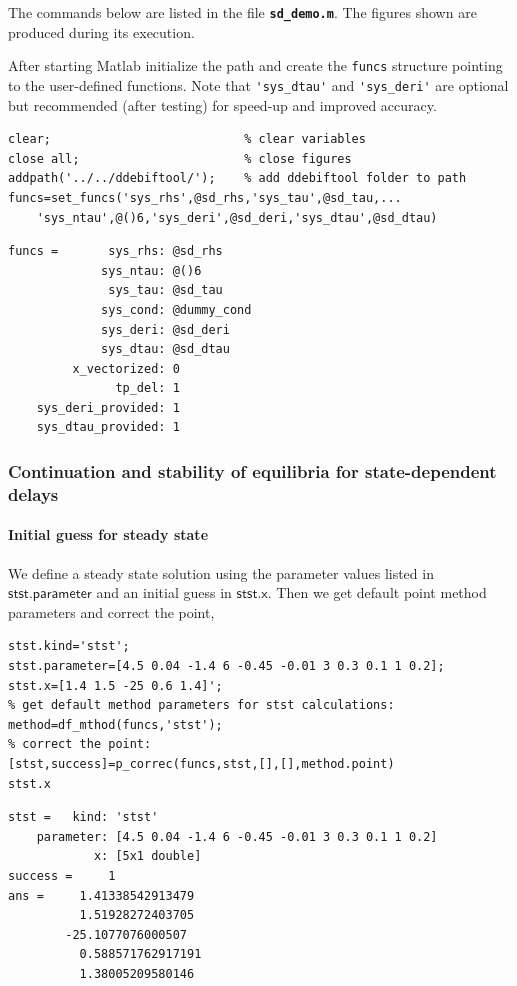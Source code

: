 \documentclass[10pt]{scrartcl}
\newcommand{\file}[1]{\textbf{\texttt{#1}}}
\newcommand{\parm}[1]{\mathsf{#1}}
\newcommand{\blist}[1]{\mbox{\lstinline!#1!}}
\begin{document}
The commands below are listed in the file \file{sd\_demo.m}.
The figures shown are produced during its execution. 

After starting Matlab initialize the path and create the \blist{funcs}
structure pointing to the user-defined functions. Note that
\blist{'sys_dtau'} and \blist{'sys_deri'} are optional but recommended
(after testing) for speed-up and improved accuracy.
\begin{lstlisting}
clear;                           % clear variables
close all;                       % close figures
addpath('../../ddebiftool/');    % add ddebiftool folder to path
funcs=set_funcs('sys_rhs',@sd_rhs,'sys_tau',@sd_tau,...
    'sys_ntau',@()6,'sys_deri',@sd_deri,'sys_dtau',@sd_dtau)
\end{lstlisting}
{\small
\begin{verbatim}
funcs =       sys_rhs: @sd_rhs
             sys_ntau: @()6
              sys_tau: @sd_tau
             sys_cond: @dummy_cond
             sys_deri: @sd_deri
             sys_dtau: @sd_dtau
         x_vectorized: 0
               tp_del: 1
    sys_deri_provided: 1
    sys_dtau_provided: 1
\end{verbatim}
}

\subsubsection{Continuation and stability of equilibria for
  state-dependent delays}
\label{sec:sd:stst}

\paragraph{Initial guess for steady state}
We define a steady state solution using the
parameter values listed in $\parm{stst.parameter}$ and an initial
guess in $\parm{stst.x}$. Then we get default point method parameters 
and correct the point,
\begin{lstlisting}
stst.kind='stst';
stst.parameter=[4.5 0.04 -1.4 6 -0.45 -0.01 3 0.3 0.1 1 0.2];
stst.x=[1.4 1.5 -25 0.6 1.4]';
% get default method parameters for stst calculations:
method=df_mthod(funcs,'stst');
% correct the point:
[stst,success]=p_correc(funcs,stst,[],[],method.point)
stst.x  
\end{lstlisting}
{\small
\begin{verbatim}
stst =   kind: 'stst'
    parameter: [4.5 0.04 -1.4 6 -0.45 -0.01 3 0.3 0.1 1 0.2]
            x: [5x1 double]
success =     1
ans =     1.41338542913479
          1.51928272403705
        -25.1077076000507
          0.588571762917191
          1.38005209580146
\end{verbatim}}
\end{document}
